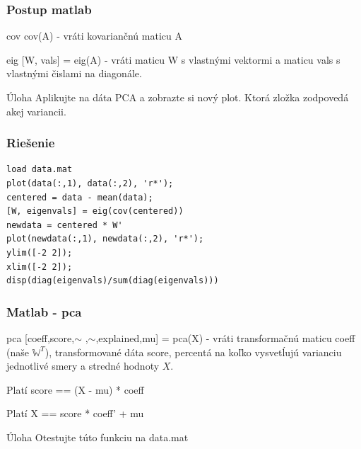 \documentclass{beamer}
\begin{document}
\begin{frame}
\frametitle{Postup matlab}

\begin{block}{cov}
cov(A) - vráti kovariančnú maticu A
\end{block}

\begin{block}{eig}
[W, vals] = eig(A) - vráti maticu W s vlastnými vektormi a maticu vals s vlastnými čislami na diagonále.
\end{block}

\begin{block}{Úloha}
Aplikujte na dáta PCA a zobrazte si nový plot. Ktorá zložka zodpovedá akej variancii.
\end{block}
\end{frame}

\begin{frame}[fragile]
\frametitle{Riešenie}
\begin{verbatim}
load data.mat
plot(data(:,1), data(:,2), 'r*');
centered = data - mean(data);
[W, eigenvals] = eig(cov(centered))
newdata = centered * W'
plot(newdata(:,1), newdata(:,2), 'r*');
ylim([-2 2]);
xlim([-2 2]);
disp(diag(eigenvals)/sum(diag(eigenvals)))
\end{verbatim}
\end{frame}

\begin{frame}
\frametitle{Matlab - pca}

\begin{block}{pca}
[coeff,score,$\sim$ ,$\sim$,explained,mu] = pca(X) - vráti transformačnú maticu coeff (naše $\mathbb{W}^T$), transformované dáta score, percentá na koľko vysvetĺujú varianciu jednotlivé smery a stredné hodnoty $X$.
\end{block}

\begin{block}{Platí}
score == (X - mu) * coeff
\end{block}

\begin{block}{Platí}
X == score * coeff' + mu
\end{block}

\begin{block}{Úloha}
Otestujte túto funkciu na data.mat
\end{block}

\end{frame}
\end{document}
